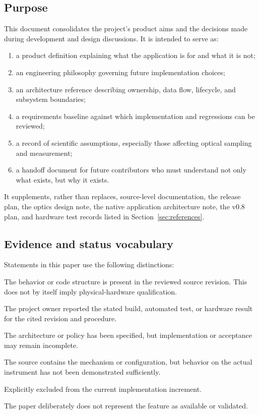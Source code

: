 \documentclass[11pt,a4paper,oneside]{article}
\begin{document}
\subsection{Purpose}
This document consolidates the project's product aims and the decisions made during development and design discussions. It is intended to serve as:
\begin{enumerate}
  \item a product definition explaining what the application is for and what it is not;
  \item an engineering philosophy governing future implementation choices;
  \item an architecture reference describing ownership, data flow, lifecycle, and subsystem boundaries;
  \item a requirements baseline against which implementation and regressions can be reviewed;
  \item a record of scientific assumptions, especially those affecting optical sampling and measurement;
  \item a handoff document for future contributors who must understand not only what exists, but why it exists.
\end{enumerate}

It supplements, rather than replaces, source-level documentation, the release plan, the optics design note, the native application architecture note, the v0.8 plan, and hardware test records listed in Section~\ref{sec:references}.

\subsection{Evidence and status vocabulary}
Statements in this paper use the following distinctions:
\begin{description}[style=nextline]
  \item[Implemented] The behavior or code structure is present in the reviewed source revision. This does not by itself imply physical-hardware qualification.
  \item[Owner-verified] The project owner reported the stated build, automated test, or hardware result for the cited revision and procedure.
  \item[Designed] The architecture or policy has been specified, but implementation or acceptance may remain incomplete.
  \item[Needs verification] The source contains the mechanism or configuration, but behavior on the actual instrument has not been demonstrated sufficiently.
  \item[Deferred] Explicitly excluded from the current implementation increment.
  \item[Not claimed] The paper deliberately does not represent the feature as available or validated.
\end{description}
\end{document}
